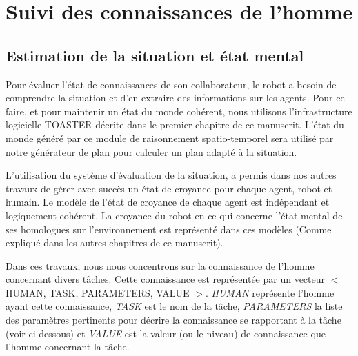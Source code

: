 \documentclass[a4paper,11pt,twoside]{StyleThese}
\begin{document}
\section{Suivi des connaissances de l'homme}

\subsection{Estimation de la situation et état mental}

Pour évaluer l'état de connaissances de son collaborateur, le robot a besoin de comprendre la situation et d'en extraire des informations sur les agents.
Pour ce faire, et pour maintenir un état du monde cohérent, nous utilisons l'infrastructure logicielle TOASTER décrite dans le premier chapitre de ce manuscrit. L'état du monde généré par ce module de raisonnement spatio-temporel sera utilisé par notre générateur de plan pour calculer un plan adapté à la situation.



L'utilisation du système d'évaluation de la situation, a permis dans nos autres travaux de gérer avec succès un état de croyance pour chaque agent, robot et humain. Le modèle de l'état de croyance de chaque agent est indépendant et logiquement cohérent. La croyance du robot en ce qui concerne l'état mental de ses homologues sur l'environnement est représenté dans ces modèles (Comme expliqué dans les autres chapitres de ce manuscrit).

Dans ces travaux, nous nous concentrons sur la connaissance de l'homme concernant divers tâches. Cette connaissance est représentée par un vecteur $<$ HUMAN, TASK, PARAMETERS, VALUE $> $.
\textit{HUMAN} représente l'homme ayant cette connaissance, \textit{TASK} est le nom de la tâche, \textit{PARAMETERS} la liste des paramètres pertinents pour décrire la connaissance se rapportant à la tâche (voir ci-dessous) et \textit{VALUE} est la valeur (ou le niveau) de connaissance que l'homme concernant la tâche.
\end{document}
